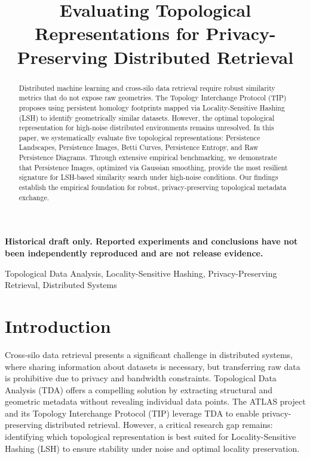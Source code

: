 \documentclass[10pt, conference]{IEEEtran}
\begin{document}
\title{Evaluating Topological Representations for Privacy-Preserving Distributed Retrieval}

\author{
}

\maketitle

\begin{center}
\textbf{Historical draft only. Reported experiments and conclusions have not been independently reproduced and are not release evidence.}
\end{center}

\begin{abstract}
Distributed machine learning and cross-silo data retrieval require robust similarity metrics that do not expose raw geometries. The Topology Interchange Protocol (TIP) proposes using persistent homology footprints mapped via Locality-Sensitive Hashing (LSH) to identify geometrically similar datasets. However, the optimal topological representation for high-noise distributed environments remains unresolved. In this paper, we systematically evaluate five topological representations: Persistence Landscapes, Persistence Images, Betti Curves, Persistence Entropy, and Raw Persistence Diagrams. Through extensive empirical benchmarking, we demonstrate that Persistence Images, optimized via Gaussian smoothing, provide the most resilient signature for LSH-based similarity search under high-noise conditions. Our findings establish the empirical foundation for robust, privacy-preserving topological metadata exchange.
\end{abstract}

\begin{IEEEkeywords}
Topological Data Analysis, Locality-Sensitive Hashing, Privacy-Preserving Retrieval, Distributed Systems
\end{IEEEkeywords}

\section{Introduction}
Cross-silo data retrieval presents a significant challenge in distributed systems, where sharing information about datasets is necessary, but transferring raw data is prohibitive due to privacy and bandwidth constraints. Topological Data Analysis (TDA) offers a compelling solution by extracting structural and geometric metadata without revealing individual data points. The ATLAS project and its Topology Interchange Protocol (TIP) leverage TDA to enable privacy-preserving distributed retrieval. However, a critical research gap remains: identifying which topological representation is best suited for Locality-Sensitive Hashing (LSH) to ensure stability under noise and optimal locality preservation.
\end{document}
